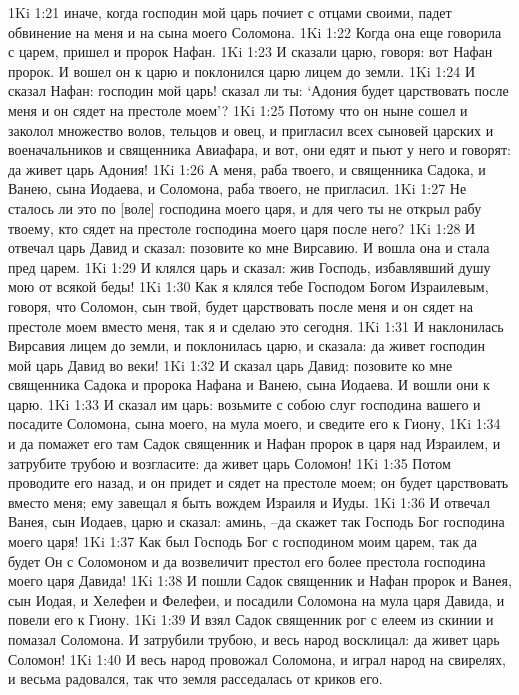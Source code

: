 1Ki 1:21  иначе, когда господин мой царь почиет с отцами своими, падет обвинение на меня и на сына моего Соломона.
1Ki 1:22  Когда она еще говорила с царем, пришел и пророк Нафан.
1Ki 1:23  И сказали царю, говоря: вот Нафан пророк. И вошел он к царю и поклонился царю лицем до земли.
1Ki 1:24  И сказал Нафан: господин мой царь! сказал ли ты: `Адония будет царствовать после меня и он сядет на престоле моем'?
1Ki 1:25  Потому что он ныне сошел и заколол множество волов, тельцов и овец, и пригласил всех сыновей царских и военачальников и священника Авиафара, и вот, они едят и пьют у него и говорят: да живет царь Адония!
1Ki 1:26  А меня, раба твоего, и священника Садока, и Ванею, сына Иодаева, и Соломона, раба твоего, не пригласил.
1Ki 1:27  Не сталось ли это по [воле] господина моего царя, и для чего ты не открыл рабу твоему, кто сядет на престоле господина моего царя после него?
1Ki 1:28  И отвечал царь Давид и сказал: позовите ко мне Вирсавию. И вошла она и стала пред царем.
1Ki 1:29  И клялся царь и сказал: жив Господь, избавлявший душу мою от всякой беды!
1Ki 1:30  Как я клялся тебе Господом Богом Израилевым, говоря, что Соломон, сын твой, будет царствовать после меня и он сядет на престоле моем вместо меня, так я и сделаю это сегодня.
1Ki 1:31  И наклонилась Вирсавия лицем до земли, и поклонилась царю, и сказала: да живет господин мой царь Давид во веки!
1Ki 1:32  И сказал царь Давид: позовите ко мне священника Садока и пророка Нафана и Ванею, сына Иодаева. И вошли они к царю.
1Ki 1:33  И сказал им царь: возьмите с собою слуг господина вашего и посадите Соломона, сына моего, на мула моего, и сведите его к Гиону,
1Ki 1:34  и да помажет его там Садок священник и Нафан пророк в царя над Израилем, и затрубите трубою и возгласите: да живет царь Соломон!
1Ki 1:35  Потом проводите его назад, и он придет и сядет на престоле моем; он будет царствовать вместо меня; ему завещал я быть вождем Израиля и Иуды.
1Ki 1:36  И отвечал Ванея, сын Иодаев, царю и сказал: аминь, --да скажет так Господь Бог господина моего царя!
1Ki 1:37  Как был Господь Бог с господином моим царем, так да будет Он с Соломоном и да возвеличит престол его более престола господина моего царя Давида!
1Ki 1:38  И пошли Садок священник и Нафан пророк и Ванея, сын Иодая, и Хелефеи и Фелефеи, и посадили Соломона на мула царя Давида, и повели его к Гиону.
1Ki 1:39  И взял Садок священник рог с елеем из скинии и помазал Соломона. И затрубили трубою, и весь народ восклицал: да живет царь Соломон!
1Ki 1:40  И весь народ провожал Соломона, и играл народ на свирелях, и весьма радовался, так что земля расседалась от криков его.
